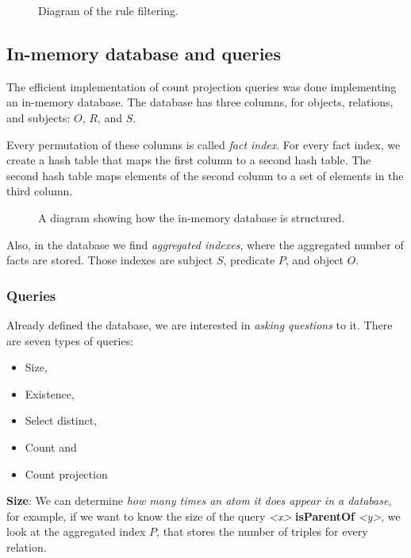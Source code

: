 \documentclass{article}
\newcommand{\triple}[3]{{\itshape\textless#1\textgreater} {\bfseries#2} {\itshape\textless#3\textgreater}}
\begin{document}
\begin{figure}[H]
\centering
\resizebox{!}{0.50\textheight}{%
    
}
\caption{Diagram of the rule filtering.}
\label{fig:accepted_for_output}
\end{figure}

\subsection{In-memory database and queries}
\label{ssec:in_memory_database}

The efficient implementation of count projection queries was done implementing
an in-memory database. The database has three columns, for objects, relations,
and subjects: $O$, $R$, and $S$.

Every permutation of these columns is called \textit{fact index}. For every
fact index, we create a hash table that maps the first column to a second hash
table. The second hash table maps elements of the second column to a set of
elements in the third column.

\begin{figure}[H]
\centering
    
\caption{A diagram showing how the in-memory database is structured.}
\label{fig:db}
\end{figure}

Also, in the database we find \textit{aggregated indexes}, where the aggregated
number of facts are stored. Those indexes are subject $S$, predicate $P$, and object $O$.

\subsubsection{Queries}
\label{sssec:queries}

Already defined the database, we are interested in \textit{asking questions} to
it. There are seven types of queries:

\begin{itemize}
    \item Size,
    \item Existence,
    \item Select distinct,
    \item Count and
    \item Count projection
\end{itemize}

\noindent \textbf{Size}: We can determine \textit{how many times an
atom it does appear in a database}, for example, if we want to know the size of
the query \triple{x}{isParentOf}{y}, we look at the aggregated index $P$, that
stores the number of triples for every relation.
\end{document}
